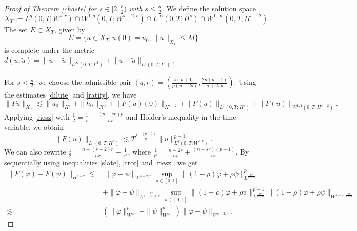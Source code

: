 \documentclass[preprint,compress,12pt]{elsarticle}
\numberwithin{equation}{section}
\begin{document}
\begin{proof}[Proof of Theorem \ref{chaste} for $s\in[2,\frac{5}{2})$ with $s\leq \frac{n}{2}$]
	We define the solution space
	\begin{equation}\label{afh}
		X_{T}:=L^{q}(0,T;W^{s,r})\cap W^{1,q}(0,T;W^{s-2,r})\cap L^{\infty}(0,T;H^{s})
		\cap W^{1,\infty}(0,T;H^{s-2}).
	\end{equation}
	The set $E\subset X_{T}$, given by
	\begin{equation*}
		E=\{ u\in X_{T} |\, u(0)=u_{0}, \|u\|_{X_{T}}\leq M\}
	\end{equation*}
	is complete under the metric $d(u,\tilde{u})=\|u-\tilde{u}\|_{L^{\infty}(0,T;L^{2})}+\|u-\tilde{u}\|_{L^{q}(0,T;L^{r})}$.
	
	For $s<\frac{n}{2}$, we choose the admissible pair $(q,r)=\left(\frac{4(p+1)}{p(n-2s)}, \frac{2n(p+1)}{n+2sp}\right)$. Using the estimates \eqref{dilute} and \eqref{ratify}, we have
	\begin{equation}\label{ab1}
		\|\Gamma u\|_{X_{T}}\lesssim \|u_{0}\|_{H^{s}}+\|h_{0}\|_{\mathcal{H}^{s}}+\|F(u)(0)\|_{H^{s-2}}+\|F(u)\|_{L^{1}(0,T;H^{s})}+\|F(u)\|_{W^{1,1}(0,T;H^{s-2})}.
	\end{equation}
	Applying \eqref{riesz} with $\frac{1}{2}=\frac{1}{r}+\frac{(n-sr)p}{nr}$ and H\"{o}lder's inequality in the time variable, we obtain
	\begin{equation}\label{ab3}
		\|F(u)\|_{L^{1}(0,T;H^{s})}\lesssim T^{\frac{q-(p+1)}{q}}\|u\|_{L^{q}(0,T;W^{s,r})}^{p+1}.
	\end{equation}
	We can also rewrite $\frac{1}{2}=\frac{n-(s-2)r}{nr}+\frac{1}{r^{*}}$, where $\frac{1}{r^{*}}=\frac{n-2r}{nr}+\frac{(n-sr)(p-1)}{nr}$. By sequentially using inequalities \eqref{slate}, \eqref{trot} and \eqref{riesz}, we get
	{\small \begin{equation}\label{adorn}
			\begin{aligned}
				\|F(\varphi)-F(\psi)\|_{H^{s-2}}
				\lesssim &\, \|\varphi-\psi\|_{W^{s-2,r}}\sup_{\rho\in[0,1]}\|(1-\rho)\varphi+\rho\psi\|_{L^{\frac{nr}{n-sr}}}^{p}\\
				&+\|\varphi-\psi\|_{L^{\frac{nr}{n-(s-2)r}}}\sup_{\rho\in[0,1]}\|(1-\rho)\varphi+\rho\psi\|_{L^{\frac{nr}{n-sr}}}^{p-1}
				\|(1-\rho)\varphi+\rho\psi\|_{W^{s-2,\frac{nr}{n-2r}}} \\
				\lesssim  & \left(\|\varphi\|_{W^{s,r}}^{p}+\|\psi\|_{W^{s,r}}^{p}\right)\|\varphi-\psi\|_{W^{s-2,r}}.
			\end{aligned}
	\end{equation}}

\end{proof}
\end{document}
